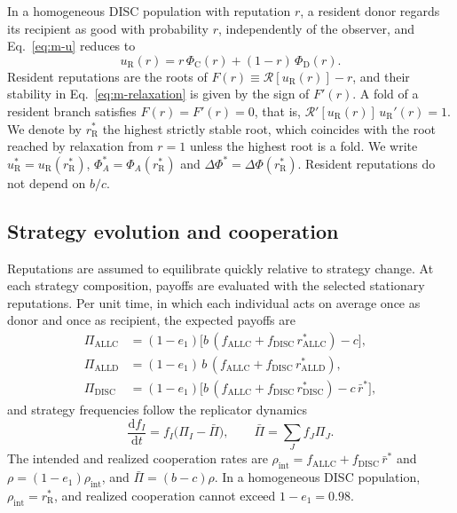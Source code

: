\documentclass[fleqn,10pt]{wlscirep}
\newcommand{\Rmap}{\mathscr{R}}            %
\newcommand{\rR}{r_{\mathrm{R}}^{*}}
\newcommand{\uR}{u_{\mathrm{R}}^{*}}
\newcommand{\PhiC}{\Phi_{\mathrm{C}}}
\newcommand{\PhiD}{\Phi_{\mathrm{D}}}
\newcommand{\dPhi}{\Delta\Phi^{*}}
\newcommand{\dd}{\mathrm{d}}
\newcommand{\ALLC}{\mathrm{ALLC}}
\newcommand{\ALLD}{\mathrm{ALLD}}
\newcommand{\DISC}{\mathrm{DISC}}
\theoremstyle{plain}
\begin{document}
In a homogeneous DISC population with reputation $r$, a resident donor regards its recipient as good with probability $r$, independently of the observer, and Eq.~\eqref{eq:m-u} reduces to
\begin{equation}
u_{\mathrm R}(r)=r\,\PhiC(r)+(1-r)\,\PhiD(r).
\label{eq:m-resident}
\end{equation}
Resident reputations are the roots of $F(r)\equiv\Rmap[u_{\mathrm R}(r)]-r$, and their stability in Eq.~\eqref{eq:m-relaxation} is given by the sign of $F'(r)$. A fold of a resident branch satisfies $F(r)=F'(r)=0$, that is, $\Rmap'[u_{\mathrm R}(r)]\,u_{\mathrm R}'(r)=1$. We denote by $\rR$ the highest strictly stable root, which coincides with the root reached by relaxation from $r=1$ unless the highest root is a fold. We write $\uR=u_{\mathrm R}(\rR)$, $\Phi_A^*=\Phi_A(\rR)$ and $\dPhi=\Delta\Phi(\rR)$. Resident reputations do not depend on $b/c$.

\subsection*{Strategy evolution and cooperation}

Reputations are assumed to equilibrate quickly relative to strategy change. At each strategy composition, payoffs are evaluated with the selected stationary reputations. Per unit time, in which each individual acts on average once as donor and once as recipient, the expected payoffs are
\begin{equation}
\begin{aligned}
\Pi_{\ALLC}&=(1-e_1)\bigl[b\,(f_{\ALLC}+f_{\DISC}\,r^*_{\ALLC})-c\bigr],\\
\Pi_{\ALLD}&=(1-e_1)\,b\,(f_{\ALLC}+f_{\DISC}\,r^*_{\ALLD}),\\
\Pi_{\DISC}&=(1-e_1)\bigl[b\,(f_{\ALLC}+f_{\DISC}\,r^*_{\DISC})-c\,\bar r^*\bigr],
\end{aligned}
\label{eq:m-payoffs}
\end{equation}
and strategy frequencies follow the replicator dynamics\cite{hofbauer1998}
\begin{equation}
\frac{\dd f_I}{\dd t}=f_I\bigl(\Pi_I-\bar\Pi\bigr),\qquad \bar\Pi=\sum_Jf_J\Pi_J.
\label{eq:m-replicator}
\end{equation}
The intended and realized cooperation rates are $\rho_{\mathrm{int}}=f_{\ALLC}+f_{\DISC}\,\bar r^*$ and $\rho=(1-e_1)\rho_{\mathrm{int}}$, and $\bar\Pi=(b-c)\rho$. In a homogeneous DISC population, $\rho_{\mathrm{int}}=\rR$, and realized cooperation cannot exceed $1-e_1=0.98$.
\end{document}
